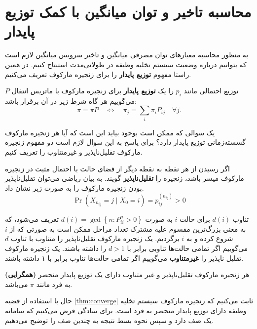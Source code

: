\section{محاسبه تاخیر و توان میانگین با کمک توزیع پایدار}
به منظور محاسبه معیارهای توان مصرفی میانگین و تاخیر سرویس میانگین لازم است که بتوانیم درباره وضعیت سیستم تخلیه وظیفه در طولانی‌مدت استنتاج کنیم. در همین راستا مفهوم \textbf{توزیع پایدار} را برای زنجیره مارکوف تعریف می‌کنیم.
\begin{defi}
توزیع احتمالی مانند $p_i$ را یک \textbf{توزیع پایدار} برای زنجیره مارکوف با ماتریس انتقال \(P\) می‌گوییم هر گاه شرط زیر در آن برقرار باشد:
\begin{equation*}
	\pi=\pi P \quad \Longleftrightarrow \quad \pi_{j}=\sum_{i} \pi_{i} P_{i j} \quad \forall j .
\end{equation*}
\end{defi}
یک سوالی که ممکن است بوجود بیاید این است که آیا هر زنجیره مارکوف گسسته‌زمانی توزیع پایدار دارد؟ برای پاسخ به این سوال لازم است دو مفهوم زنجیره مارکوف تقلیل‌ناپذیر و غیرمتناوب را تعریف کنیم.
\begin{defi}
اگر رسیدن از هر نقطه به نقطه دیگر از فضای حالت با احتمال مثبت در زنجیره مارکوف میسر باشد، زنجیره را \textbf{تقلیل‌ناپذیر} گویند. به بیان ریاضی می‌توان تقلیل‌ناپذیر بودن زنجیره مارکوف را به صورت زیر نشان داد.
\begin{equation*}
	\operatorname{Pr}\left(X_{n_{i j}}=j \mid X_{0}=i\right)=p_{i j}^{\left(n_{i j}\right)}>0
\end{equation*}
\end{defi}

\begin{defi}
تناوب $d(i)$ برای حالت $i$ به صورت $d(i)=\operatorname{gcd}\left\{n: P_{i i}^{n}>0\right\}$ تعریف می‌شود، که به معنی بزرگ‌ترین مقسوم علیه مشترک تعداد مراحل ممکن است به صورتی که از $i$ شروع کرده و به $i$ برگردیم. یک زنجیره مارکوف تقلیل‌ناپذیر را متناوب با تناوب $d$ می‌گوییم اگر تمامی حالت‌ها تناوبی برابر با $d > 1$ را داشته باشند. یک زنجیره مارکوف تقلیل ناپذیر را \textbf{غیرمتناوب} می‌گوییم اگر تمامی حالت‌ها تناوب برابر با ۱ داشته باشند.
\end{defi}
\begin{thm}
\label{thm:converge}
\textbf{(همگرایی)}
هر زنجیره مارکوف تقلیل‌ناپذیر و غیر متناوب دارای یک توزیع پایدار منحصر به فرد مانند $\pi$ می‌باشد.
\end{thm}
حال با استفاده از قضیه \ref{thm:converge} ثابت می‌کنیم که زنجیره مارکوف سیستم تخلیه وظیفه دارای توزیع پایدار منحصر به فرد است. برای سادگی فرض می‌کنیم که سامانه یک صف دارد و سپس نحوه بسط نتیجه به چندین صف را توضیح می‌دهیم.


